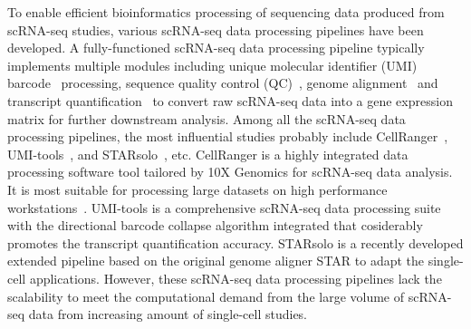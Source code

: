 \documentclass[conference]{IEEEtran}
\begin{document}
To enable efficient bioinformatics processing of sequencing data produced from scRNA-seq studies, various scRNA-seq data processing pipelines have been developed.
A fully-functioned scRNA-seq data processing pipeline typically implements multiple modules including unique molecular identifier (UMI) barcode~\cite{Smith2017UMItools} processing, sequence quality control (QC)~\cite{schmieder2011quality}, genome alignment~\cite{Dobin2013STAR,Kim2015HISAT} and transcript quantification~\cite{Parekh2018zUMIs} to convert raw scRNA-seq data into a gene expression matrix for further downstream analysis. 
Among all the scRNA-seq data processing pipelines, the most influential studies probably include CellRanger~\cite{Zheng2017Massively}, UMI-tools~\cite{Smith2017UMItools}, and STARsolo~\cite{Blibaum2019STARsolo}, etc. 
CellRanger is a highly integrated data processing software tool tailored by 10X Genomics for scRNA-seq data analysis. It is most suitable for processing large datasets on high performance workstations~\cite{Gao2020Comparison}. 
UMI-tools is a comprehensive scRNA-seq data processing suite with the directional barcode collapse algorithm integrated that cosiderably promotes the transcript quantification accuracy.
STARsolo is a recently developed extended pipeline based on the original genome aligner STAR to adapt the single-cell applications. 
However, these scRNA-seq data processing pipelines lack the scalability to meet the computational demand from the large volume of scRNA-seq data from increasing amount of single-cell studies. 

\end{document}
